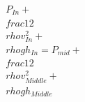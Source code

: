 \documentclass[preview]{standalone}
\begin{document}
\begin{align*}
P_{In} + \\frac{1}{2} \\rho v_{In}^2 + \\rho gh_{In} = P_{mid} + \\frac{1}{2} \\rho v_{Middle}^2 +  \\rho gh_{Middle}
\end{align*}
\end{document}
